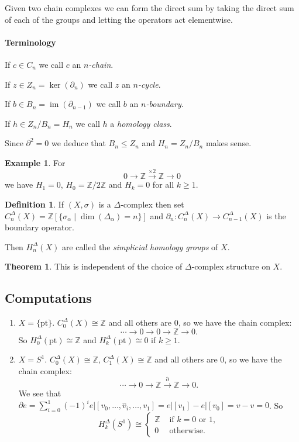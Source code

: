 \documentclass[12pt]{article}
\theoremstyle{definition}
\newtheorem*{thm}{Theorem}
\theoremstyle{definition}
\newtheorem*{defn}{Definition}
\newtheorem*{ex}{Example}
\newcommand{\ZZ}{\mathbb{Z}}
\DeclareMathOperator{\im}{im}
\begin{document}
Given two chain complexes we can form the direct sum by taking the direct sum of each of the groups and letting the operators act elementwise.

\paragraph{Terminology}
If $c\in C_n$ we call $c$ an \emph{$n$-chain}.

If $z\in Z_n = \ker(\partial_n)$ we call $z$ an \emph{$n$-cycle}.

If $b\in B_n = \im(\partial_{n-1})$ we call $b$ an \emph{$n$-boundary}.

If $h\in Z_n/B_n = H_n$ we call $h$ a \emph{homology class}.


Since $\partial^2 = 0$ we deduce that $B_n \le Z_n$ and $H_n = Z_n/B_n$ makes sense.

\begin{ex}
For
\[0\to\ZZ\xrightarrow{\times 2} \ZZ \to 0\]
we have $H_1 = 0$, $H_0 = \ZZ/2\ZZ$ and $H_k = 0$ for all $k \ge 1$.
\end{ex}

\begin{defn}
If $(X,\sigma)$ is a $\Delta$-complex then set $C_n^\Delta(X) = \ZZ[\{\sigma_\alpha \mid \dim(\Delta_\alpha) = n\}]$ and $\partial_n\colon C_n^\Delta(X) \to C_{n-1}^\Delta(X)$ is the boundary operator.

Then $H_n^\Delta(X)$ are called the \emph{simplicial homology groups} of $X$.
\end{defn}

\begin{thm}
This is independent of the choice of $\Delta$-complex structure on $X$.
\end{thm}

\subsection{Computations}
\begin{enumerate}
\item $X = \{\text{pt}\}$. $C_0^\Delta (X) \cong \ZZ$ and all others are 0, so we have the chain complex:
\[
\cdots \rightarrow 0 \rightarrow 0 \rightarrow \ZZ \rightarrow 0.
\]
So $H_0^\Delta(\text{pt}) \cong \ZZ$ and $H_k^\Delta(\text{pt}) \cong 0$ if $k\ge 1$.

\item $X = S^1$.
$C_0^\Delta (X) \cong \ZZ$, $C_1^\Delta (X) \cong \ZZ$ and all others are 0, so we have the chain complex:
\[
\cdots \rightarrow 0 \rightarrow \ZZ \xrightarrow{\partial} \ZZ \rightarrow 0.
\]
We see that $\partial e = \sum_{i=0}^{1} (-1)^i e|[v_0,\ldots,\hat{v}_i,\ldots,v_1] = e|[v_1] - e|[v_0] = v-v = 0$.
So 
\[H_k^\Delta(S^1) \cong\begin{cases}
\ZZ &\text{ if } k = 0 \text{ or }1, \\
0 &\text{ otherwise}.
\end{cases} \]





\end{enumerate}
\end{document}
